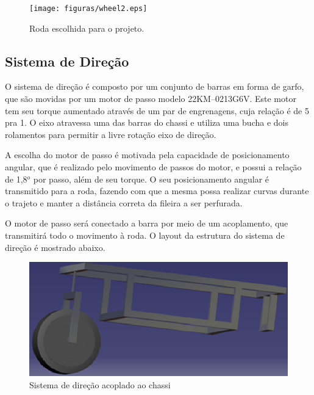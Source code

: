   \begin{figure}[!htbp]
  \begin{center}
  \texttt{[image: figuras/wheel2.eps]}
  \caption{\label{WHEEL}Roda escolhida para o projeto.}
  \end{center}
  \end{figure}

  \newpage
  \vfill
  \pagebreak

  \subsection{Sistema de Direção}
    O sistema de direção é composto por um conjunto de barras em forma de garfo, 
    que são movidas por um motor de passo modelo 22KM–0213G6V. Este motor tem seu torque aumentado através de um par de engrenagens, cuja relação é de 5 pra 1. O eixo atravessa uma das barras do chassi e utiliza uma bucha e dois rolamentos para permitir a livre rotação eixo de direção.  
     
    A escolha do motor de passo é motivada pela capacidade de posicionamento angular, que é realizado pelo movimento de passos do motor, e possui a relação de 1,8$^o$ por passo, além de seu torque. O seu posicionamento angular é transmitido para a roda, fazendo com que a mesma possa realizar curvas durante o trajeto e manter a distância correta da fileira a ser perfurada. 
    
    O motor de passo será conectado a barra por meio de um acoplamento, que transmitirá todo o movimento à roda. O layout da estrutura do sistema de direção é mostrado abaixo. 
    
    
    \begin{figure}[!htbp]
                    	\begin{center}
                    		\includegraphics[keepaspectratio=true,scale=1]{figuras/direcao1.eps}
                    		\caption{Sistema de direção acoplado ao chassi}
                    	\end{center}
     \end{figure}
                    
